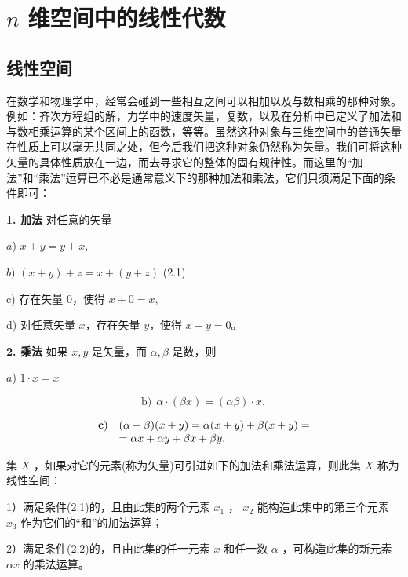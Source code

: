 \chapter{$n$ 维空间中的线性代数}

\section{线性空间}

在数学和物理学中，经常会碰到一些相互之间可以相加以及与数相乘的那种对象。例如：齐次方程组的解，力学中的速度矢量，复数，以及在分析中已定义了加法和与数相乘运算的某个区间上的函数，等等。虽然这种对象与三维空间中的普通矢量在性质上可以毫无共同之处，但今后我们把这种对象仍然称为矢量。我们可将这种矢量的具体性质放在一边，而去寻求它的整体的固有规律性。而这里的“加法”和“乘法”运算已不必是通常意义下的那种加法和乘法，它们只须满足下面的条件即可：

\textbf{1. 加法} 对任意的矢量
\begin{flushleft}
$a$) $x + y = y + x,$

$b$) $(x + y) + z = x + (y + z)$ \hfill (2.1)

c) 存在矢量 $0$，使得 $x + 0 = x,$

d) 对任意矢量 $x$，存在矢量 $y$，使得 $x + y = 0$。
\end{flushleft}

\textbf{2. 乘法} 如果 $x, y$ 是矢量，而 $\alpha, \beta$ 是数，则

$a$) $1 \cdot x = x$

\begin{equation*}
\text{b)}\ \ \alpha \cdot (\beta x) = (\alpha \beta) \cdot x,\tag{2.2}
\end{equation*}

\begin{equation*}
\begin{array}{r l} \mathbf {c}) & (\alpha + \beta) (x + y) = \alpha (x + y) + \beta (x + y) = \\ & = \alpha x + \alpha y + \beta x + \beta y. \end{array}
\end{equation*}

集 $X$ ，如果对它的元素(称为矢量)可引进如下的加法和乘法运算，则此集 $X$ 称为线性空间：

1）满足条件(2.1)的，且由此集的两个元素 $x_{1}$ ， $x_{2}$ 能构造此集中的第三个元素 $x_{3}$ 作为它们的“和”的加法运算；

2）满足条件(2.2)的，且由此集的任一元素 $x$ 和任一数 $\alpha$ ，可构造此集的新元素 $\alpha x$ 的乘法运算。

